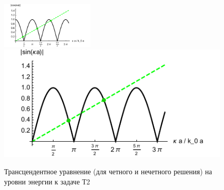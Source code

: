 \begin{figure}[h]
    \centering
    \includegraphics[width=0.4\textwidth]{figures/T2_1.pdf}
    \hspace{5 mm} 
    \includegraphics{figures/T2_2.pdf}
    \caption{Трансцендентное уравнение (для четного и нечетного решения) на уровни энергии к задаче Т2}
    \label{fig:T2}
\end{figure}
